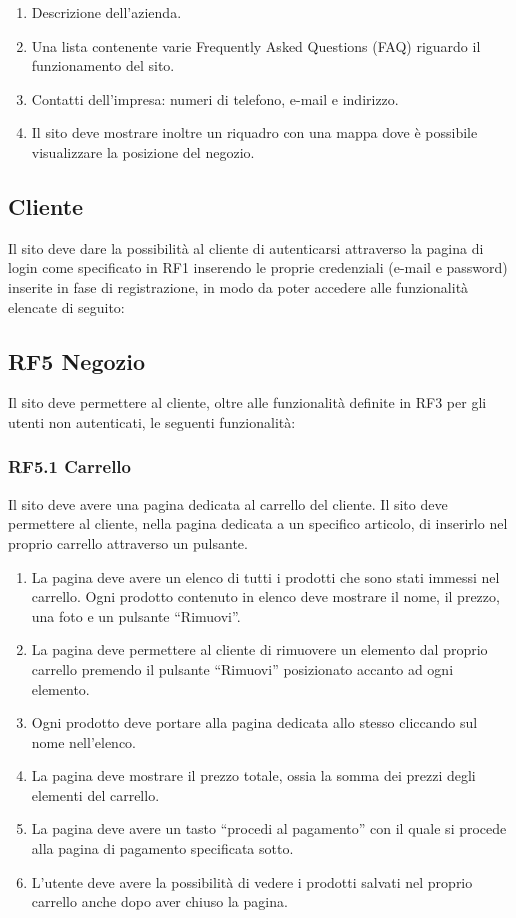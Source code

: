 \documentclass{report}
\begin{document}
\begin{enumerate}
	\item Descrizione dell'azienda.
	\item Una lista contenente varie Frequently Asked Questions (FAQ) riguardo il funzionamento del sito.
	\item Contatti dell’impresa: numeri di telefono, e-mail e indirizzo.
	\item Il sito deve mostrare inoltre un riquadro con una mappa dove è possibile visualizzare la posizione del negozio.
\end{enumerate}


\subsection{Cliente}
Il sito deve dare la possibilità al cliente di autenticarsi attraverso la pagina di login come specificato in RF1 inserendo le proprie credenziali (e-mail e password) inserite in fase di registrazione, in modo da poter accedere alle funzionalità elencate di seguito:

\subsection*{RF5 Negozio}
Il sito deve permettere al cliente, oltre alle funzionalità definite in RF3 per gli utenti non autenticati, le seguenti funzionalità:

\subsubsection{RF5.1 Carrello}
Il sito deve avere una pagina dedicata al carrello del cliente.
Il sito deve permettere al cliente, nella pagina dedicata a un specifico articolo, di inserirlo nel proprio carrello attraverso un pulsante.

\begin{enumerate}
	\item La pagina deve avere un elenco di tutti i prodotti che sono stati immessi nel carrello. Ogni prodotto contenuto in elenco deve mostrare il nome, il prezzo, una foto e un pulsante “Rimuovi”.
	
	\item La pagina deve permettere al cliente di rimuovere un elemento dal proprio carrello premendo il pulsante “Rimuovi” posizionato accanto ad ogni elemento.

	\item Ogni prodotto deve portare alla pagina dedicata allo stesso cliccando sul nome nell’elenco.
	
	\item La pagina deve mostrare il prezzo totale, ossia la somma dei prezzi degli elementi del carrello.

	\item La pagina deve avere un tasto “procedi al pagamento” con il quale si procede alla pagina di pagamento specificata sotto.
	
	\item L'utente deve avere la possibilità di vedere i prodotti salvati nel proprio carrello anche dopo aver chiuso la pagina.

\end{enumerate}
\end{document}
